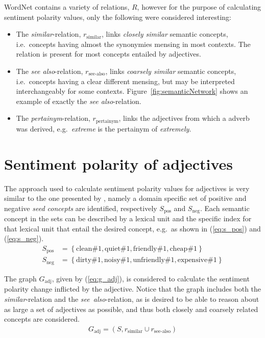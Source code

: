 WordNet contains a variety of relations, $R$, however for the purpose of calculating sentiment polarity values, only the following were considered interesting:
\begin{itemize}
	\item The \emph{similar}-relation, $r_\mathrm{similar}$, links \emph{closely similar} semantic concepts, i.e.\ concepts having almost the synonymies mensing in most contexts. The relation is present for most concepts entailed by adjectives.
	\item The \emph{see also}-relation, $r_\mathrm{see\text{-}also}$, links \emph{coarsely similar} semantic concepts, i.e.\ concepts having a clear different mensing, but may be interpreted interchangeably for some contexts. Figure~\vref{fig:semanticNetwork} shows an example of exactly the \emph{see also}-relation.
	\item The \emph{pertainym}-relation, $r_\mathrm{pertainym}$, links the adjectives from which a adverb was derived, e.g.\ \emph{extreme} is the pertainym of \emph{extremely}.
\end{itemize}
\vspace{1em}

\section{Sentiment polarity of adjectives}
\label{sec:sentimentAdj}
The approach used to calculate sentiment polarity values for adjectives is very similar to the one presented by \citeauthor{valenceShifting} , namely a domain specific set of positive and negative \emph{seed concepts} are identified, respectively $S_\mathrm{pos}$ and $S_\mathrm{neg}$. Each semantic concept in the sets can be described by a lexical unit and the specific index for that lexical unit that entail the desired concept, e.g.\ as shown in (\ref{eq:s_pos}) and (\ref{eq:s_neg}).
\begin{align}
	S_\mathrm{pos} &= \left\{ \text{clean}\#1, \text{quiet}\#1, \text{friendly}\#1, \text{cheap}\#1 \right\} \label{eq:s_pos}\\
	S_\mathrm{neg} &= \left\{ \text{dirty}\#1, \text{noisy}\#1, \text{unfriendly}\#1, \text{expensive}\#1 \right\} \label{eq:s_neg}
\end{align}

The graph $G_\mathrm{adj}$, given by (\ref{eq:g_adj}), is considered to calculate the sentiment polarity change inflicted by the adjective. Notice that the graph includes both the \emph{similar}-relation and the \emph{see\ also}-relation, as is desired to be able to reason about as large a set of adjectives as possible, and thus both closely and coarsely related concepts are considered.
\begin{align}
	G_\mathrm{adj} = (S, r_\mathrm{similar} \cup r_\mathrm{see\text{-}also})
	\label{eq:g_adj}
\end{align}
 
